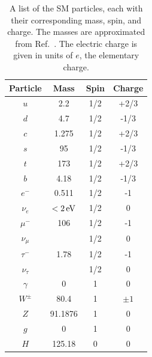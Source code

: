 \begin{table}[!htb]
	\centering
	\caption{A list of the SM particles, each with their corresponding mass, spin, and charge. The masses are approximated from Ref.~\cite{Tanabashi:2018oca}. The electric charge is given in units of $e$, the elementary charge. }
	\vspace{\baselineskip}
	\begin{tabular}{c|ccc}
	\hline \hline
	Particle       & Mass & Spin & Charge \\
	\hline
	$u$ & 2.2\MeV   & 1/2 & +2/3 \\
	$d$ & 4.7\MeV   & 1/2 & -1/3 \\
	$c$ & 1.275\GeV & 1/2 & +2/3 \\
	$s$ & 95\MeV    & 1/2 & -1/3 \\
	$t$ & 173\GeV   & 1/2 & +2/3 \\
	$b$ & 4.18\GeV  & 1/2 & -1/3 \\
	\hline
	$e^-$        & 0.511\MeV    & 1/2 & -1 \\
	$\nu_e$      & $< 2\eV$     & 1/2 & 0  \\
	$\mu^-$      & 106\MeV      & 1/2 & -1 \\
	$\nu_{\mu}$  & \correction{$< 2\eV$} & 1/2 & 0  \\ %
	$\tau^-$     & 1.78\GeV     & 1/2 & -1 \\
	$\nu_{\tau}$ & \correction{$< 2\eV$} & 1/2 & 0  \\ %
	\hline
	$\gamma$   & 0           & 1 & 0    \\
	$W^{\pm}$  & 80.4\GeV    & 1 & $\pm1$ \\
	$Z$        & 91.1876\GeV & 1 & 0    \\
	$g$        & 0           & 1 & 0    \\
	$H$        & 125.18\GeV  & 0 & 0    \\
	\hline \hline
	\end{tabular}
	\label{tab:SM_particles}
\end{table}

